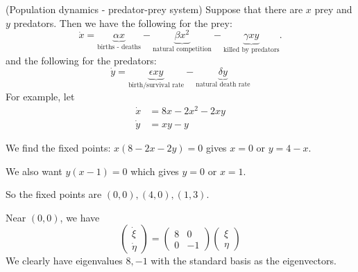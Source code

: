 \documentclass[a4paper]{article}
\begin{document}
\begin{eg}
  (Population dynamics - predator-prey system) Suppose that there are $x$ prey and $y$ predators. Then we have the following for the prey:
\[
\dot x = \underbrace{\alpha x}_{\text{births - deaths}} - \underbrace{\beta x^2}_{\text{natural competition}} - \underbrace{\gamma xy}_{\text{killed by predators}}.
\]
and the following for the predators:
\[
\dot y = \underbrace{\epsilon xy}_{\text{birth/survival rate}} - \underbrace{\delta y}_{\text{natural death rate}}
\]
For example, let
\begin{align*}
  \dot x &= 8x - 2x^2 - 2xy\\
  \dot y &= xy - y
\end{align*}

We find the fixed points: $x(8 - 2x - 2y) = 0$ gives $x = 0$ or $y = 4 - x$.

We also want $y(x - 1) = 0$ which gives $y = 0$ or $x = 1$.

So the fixed points are $(0, 0), (4, 0), (1, 3)$.

Near $(0, 0)$, we have
\[
\begin{pmatrix}
  \dot \xi\\\dot \eta
\end{pmatrix}=
\begin{pmatrix}
  8 & 0\\
  0 & -1
\end{pmatrix}
\begin{pmatrix}
  \xi\\
  \eta
\end{pmatrix}
\]
We clearly have eigenvalues $8, -1$ with the standard basis as the eigenvectors.

\begin{center}
\end{center}


\end{eg}
\end{document}
